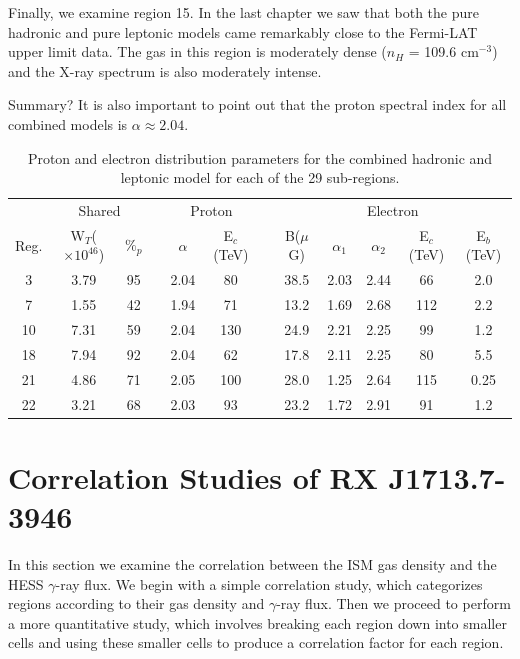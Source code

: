 \documentclass[12pt,a4paper]{article}
\begin{document}
Finally, we examine region 15. In the last chapter we saw that both the pure hadronic and pure leptonic models came remarkably close to the Fermi-LAT upper limit data. The gas in this region is moderately dense ($n_H$ = 109.6 cm$^{-3}$) and the X-ray spectrum is also moderately intense. 


Summary? It is also important to point out that the proton spectral index for all combined models is $\alpha \approx 2.04$. 
\begin{table}[H] 
	\begin{center}
		\begin{tabular}{cccccccccccc}
			\toprule 
			&
			\multicolumn{2}{c}{Shared} 
			&&
			\multicolumn{2}{c}{Proton} 
			&&
			\multicolumn{5}{c}{Electron}\\
			\cline{2-3} \cline{5-6} \cline{8-12}
			Reg.& W$_{T}$($\times 10^{46}$) & $\%_p$ && $\alpha$ & E$_c$(TeV) && B($\mu$G)&$\alpha_1$& $\alpha_2$ & E$_c$(TeV) & E$_b$(TeV)  \\
			\hline
			3 & 3.79 & 95 && 2.04 & 80 && 38.5 & 2.03 & 2.44 & 66 & 2.0\\
			7 & 1.55 & 42 && 1.94 & 71 && 13.2 & 1.69 & 2.68 & 112 & 2.2\\ 
			10 & 7.31 & 59 && 2.04 & 130 && 24.9 & 2.21 & 2.25 & 99 & 1.2\\ 
			18 & 7.94 & 92 && 2.04 & 62 && 17.8 & 2.11 & 2.25 & 80 & 5.5\\ 
			21 & 4.86 & 71 && 2.05 & 100 && 28.0 & 1.25 & 2.64 & 115 & 0.25\\ 
			22 & 3.21 & 68 && 2.03 & 93 && 23.2 & 1.72 & 2.91 & 91 & 1.2\\ 
			\bottomrule 
		\end{tabular} 
	\end{center}
	\caption{Proton and electron distribution parameters for the combined hadronic and leptonic model for each of the 29 sub-regions.}
	\label{tab:regionalparamscomb}
\end{table}


\newpage
\section{Correlation Studies of RX J1713.7-3946} \label{sec:corstudy}
In this section we examine the correlation between the ISM gas density and the HESS $\gamma$-ray flux. 
We begin with a simple correlation study, which categorizes regions according to their gas density and $\gamma$-ray flux. 
Then we proceed to perform a more quantitative study, which involves breaking each region down into smaller cells and using these smaller cells to produce a correlation factor for each region.
\end{document}

